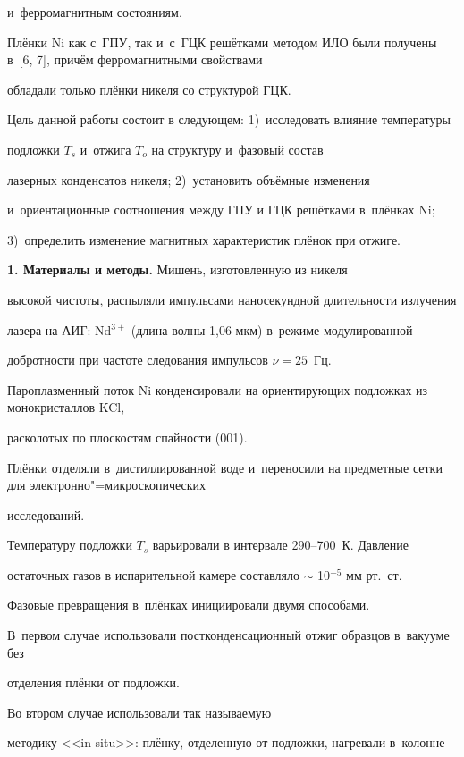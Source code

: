 и~ферромагнитным состояниям.

Плёнки Ni как с~ГПУ, так и~с~ГЦК решётками методом ИЛО были получены в~[6, 7], причём ферромагнитными свойствами

обладали только плёнки никеля со структурой ГЦК.



Цель данной работы состоит в следующем: 1)~исследовать влияние температуры

подложки $T_{s}$ и~отжига $T_{o}$ на структуру и~фазовый состав

лазерных конденсатов никеля; 2)~установить объёмные изменения

и~ориентационные соотношения между ГПУ и ГЦК решётками в~плёнках Ni;

3)~определить изменение магнитных характеристик плёнок при отжиге.





\textbf{1. Материалы и методы.} Мишень, изготовленную из никеля

высокой чистоты, распыляли импульсами наносекундной длительности излучения

лазера на АИГ: Nd$^{3+}$ (длина волны 1,06 мкм) в~режиме модулированной

добротности при частоте следования импульсов $\nu  = 25$~Гц.

Пароплазменный поток Ni конденсировали на ориентирующих подложках из монокристаллов KCl,

расколотых по плоскостям спайности (001).

Плёнки отделяли в~дистиллированной воде и~переносили на предметные сетки для электронно"=микроскопических

исследований.



Температуру подложки $T_{s}$ варьировали в интервале 290--700~К. Давление

остаточных газов в испарительной камере составляло $\sim $ 10$^{-5}$ мм рт.~ст.

Фазовые превращения в~плёнках инициировали двумя способами.

В~первом случае использовали постконденсационный отжиг образцов в~вакууме без

отделения плёнки от подложки.

Во втором случае использовали так называемую

методику <<in situ>>: плёнку, отделенную от подложки, нагревали в~колонне


